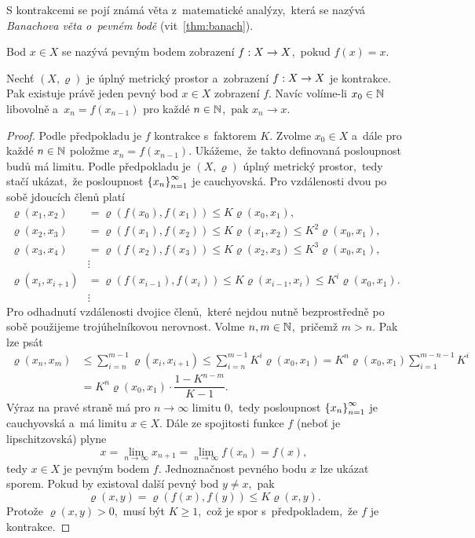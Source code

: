 S kontrakcemi se pojí známá věta z~matematické analýzy,~která se nazývá \emph{Banachova věta o~pevném bodě} (vit~\ref{thm:banach}).
\begin{definition}\label{def:pevny-bod}
    Bod $x\in X$ se nazývá pevným bodem zobrazení $f:X \rightarrow X$,~pokud $f(x)=x$.
\end{definition}
\begin{theorem}\label{thm:banach}
    Nechť $(X,\varrho)$ je úplný metrický prostor a~zobrazení $f:X \rightarrow X$ je kontrakce. Pak existuje právě jeden pevný bod $x\in X$ zobrazení $f$. Navíc volíme-li $x_0\in\mathbb{N}$ libovolně a~$x_n=f(x_{n-1})$ pro každé $n\in\mathbb{N}$,~pak $x_n\to x$.
\end{theorem}
\begin{proof}
    Podle předpokladu je $f$ kontrakce s~faktorem $K$. Zvolme $x_0\in X$ a~dále pro každé $n\in\mathbb{N}$ položme $x_n=f(x_{n-1})$. Ukážeme,~že takto definovaná posloupnost budů má limitu. Podle předpokladu je $(X,\varrho)$ úplný metrický prostor,~tedy stačí ukázat,~že posloupnost $\left\{x_n\right\}_{n=1}^\infty$ je cauchyovská. Pro vzdálenosti dvou po sobě jdoucích členů platí
    \begin{align*}
        \varrho(x_1,x_2)&=\varrho(f(x_0),f(x_1))\leqslant K\varrho(x_0,x_1),\\
        \varrho(x_2,x_3)&=\varrho(f(x_1),f(x_2))\leqslant K\varrho(x_1,x_2)\leqslant K^2\varrho(x_0,x_1),\\
        \varrho(x_3,x_4)&=\varrho(f(x_2),f(x_3))\leqslant K\varrho(x_2,x_3)\leqslant K^3\varrho(x_0,x_1),\\
        &\vdots\\
        \varrho(x_i,x_{i+1})&=\varrho(f(x_{i-1}),f(x_i))\leqslant K\varrho(x_{i-1},x_i)\leqslant K^i\varrho(x_0,x_1).\\
        &\vdots
    \end{align*}
    Pro odhadnutí vzdálenosti dvojice členů,~které nejdou nutně bezprostředně po sobě použijeme trojúhelníkovou nerovnost. Volme $n,m\in\mathbb{N}$,~pričemž $m>n$. Pak lze psát
    \begin{align*}
        \varrho(x_n,x_m)&\leqslant\sum_{i=n}^{m-1}\varrho(x_i,x_{i+1})\leqslant\sum_{i=n}^{m-1}K^i\varrho(x_0,x_1)=K^n\varrho(x_0,x_1)\sum_{i=1}^{m-n-1}K^i\\
        &=K^n\varrho(x_0,x_1)\cdot\dfrac{1-K^{n-m}}{K-1}.
    \end{align*}
    Výraz na pravé straně má pro $n\to\infty$ limitu $0$,~tedy posloupnost $\left\{x_n\right\}_{n=1}^\infty$ je cauchyovská a~má limitu $x\in X$. Dále ze spojitosti funkce $f$ (neboť je lipschitzovská) plyne
    \[x=\lim_{n\to\infty}x_{n+1}=\lim_{n\to\infty}f(x_n)=f(x),\]
    tedy $x\in X$ je pevným bodem $f$. Jednoznačnost pevného bodu $x$ lze ukázat sporem. Pokud by existoval další pevný bod $y\neq x$,~pak
    \[\varrho(x,y)=\varrho(f(x),f(y))\leqslant K\varrho(x,y).\]
    Protože $\varrho(x,y)>0$,~musí být $K\geqslant 1$,~což je spor s~předpokladem,~že $f$ je kontrakce.
\end{proof}
